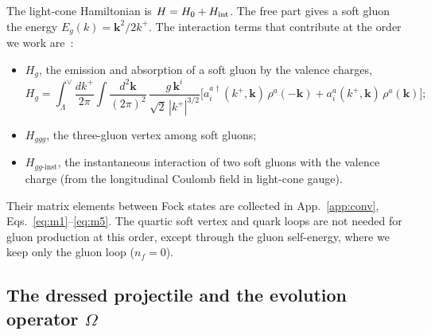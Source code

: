 The light-cone Hamiltonian is $H=H_0+H_{\rm int}$. The free part gives a soft gluon the energy $E_g(k)=\mathbf k^2/2k^+$. The interaction terms that contribute at the order we work are~\cite{Lublinsky:2016meo}:
\begin{itemize}
\item $H_g$, the emission and absorption of a soft gluon by the valence charges,
\begin{equation}
H_g=\int_{\Lambda}^{\vee}\frac{dk^+}{2\pi}\int\frac{d^2\mathbf k}{(2\pi)^2}\,\frac{g\,\mathbf k^i}{\sqrt2\,|k^+|^{3/2}}\Big[a_i^{a\dagger}(k^+,\mathbf k)\,\rho^a(-\mathbf k)+a_i^a(k^+,\mathbf k)\,\rho^a(\mathbf k)\Big];
\label{eq:Hg}
\end{equation}
\item $H_{ggg}$, the three-gluon vertex among soft gluons;
\item $H_{gg\text{-inst}}$, the instantaneous interaction of two soft gluons with the valence charge (from the longitudinal Coulomb field in light-cone gauge).
\end{itemize}
Their matrix elements between Fock states are collected in App.~\ref{app:conv}, Eqs.~\eqref{eq:m1}--\eqref{eq:m5}. The quartic soft vertex and quark loops are not needed for gluon production at this order, except through the gluon self-energy, where we keep only the gluon loop ($n_f=0$).

\subsection{The dressed projectile and the evolution operator \texorpdfstring{$\Omega$}{Omega}}\label{sec:Omega}

